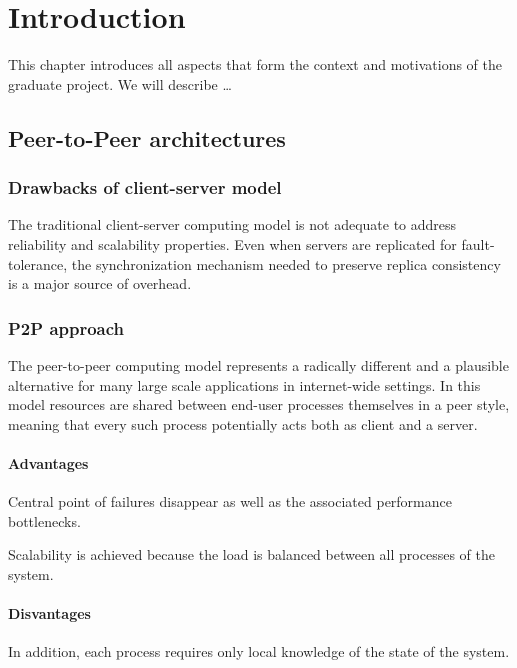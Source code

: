 

\chapter{Introduction}

This chapter introduces all aspects that form the context and
motivations of the graduate project. We will describe \ldots

\section{Peer-to-Peer architectures}

\subsection{Drawbacks of client-server model}
The traditional client-server computing model is not adequate to address reliability and scalability properties. Even when servers are replicated for fault-tolerance, the synchronization mechanism needed to preserve replica consistency is a major source of overhead.

\subsection{P2P approach}
The peer-to-peer computing model represents a radically different and a plausible alternative for many large scale applications in internet-wide settings. In this model resources are shared between end-user processes themselves in a peer style, meaning that every such process potentially acts both as client and a server.

\subsubsection{Advantages}
Central point of failures disappear as well as the associated performance bottlenecks.

Scalability is achieved because the load is balanced between all processes of the system.

\subsubsection{Disvantages}
In addition, each process requires only local knowledge of the state of the system.

